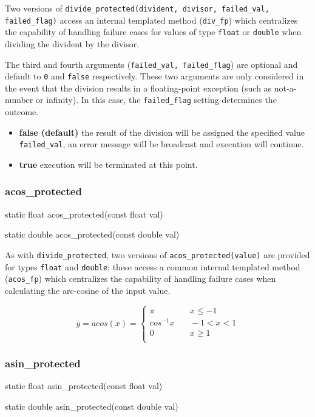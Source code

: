 \documentclass[11pt,fleqn]{report}
\begin{document}
Two versions of \texttt{divide\_protected(divident, divisor,
failed\_val, failed\_flag)} access an internal templated method
(\texttt{div\_fp}) which centralizes the capability
of handling failure cases for values of type \texttt{float} or
\texttt{double} when dividing the divident by the divisor.

The third and fourth arguments (\texttt{failed\_val, failed\_flag}) are optional
and default to \texttt{0} and \texttt{false} respectively.
These two arguments are only considered in the event that the division results
in a floating-point exception (such as not-a-number or infinity).
In this case, the \texttt{failed\_flag} setting determines the outcome.

\begin{itemize}
\item \textbf{false (default)} the result of the division will be assigned
the specified value \texttt{failed\_val}, an error message will be
broadcast and execution will continue.
\item \textbf{true} execution will be terminated at this point.
\end{itemize}

\subsubsection{acos\_protected}
\begin{code}
static float acos_protected(const float val)

static double acos_protected(const double val)
\end{code}

As with \texttt{divide\_protected}, two versions of
\texttt{acos\_protected(value)} are provided for types
\texttt{float} and \texttt{double}; these access a common
internal templated method (\texttt{acos\_fp}) which
centralizes the capability of handling failure cases when calculating
the arc-cosine of the input value.

\begin{equation*}
y = acos (x) = \left\{
 \begin{array}{ll}
\pi& \quad x \leqslant -1 \\
cos^{-1} x & \quad -1 < x < 1 \\
0& \quad x \geqslant1 \\
 \end{array}
\right.
\end{equation*}

\subsubsection{asin\_protected}
\begin{code}
static float asin_protected(const float val)

static double asin_protected(const double val)
\end{code}
\end{document}
